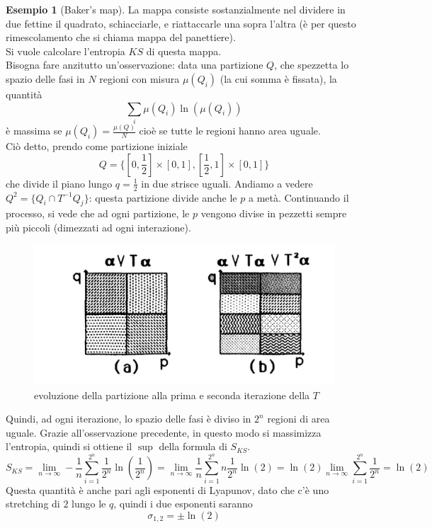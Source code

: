 \documentclass[a4paper,12pt]{article}
\theoremstyle{plain}
\theoremstyle{definition}
\newtheorem{exmp}{Esempio}[section]
\newcommand{\f}[2]{\frac{#1}{#2}}
\theoremstyle{remark}
\begin{document}
\begin{exmp}[Baker's map]
La mappa consiste sostanzialmente nel dividere in due fettine il quadrato, schiacciarle, e riattaccarle una sopra l'altra (è per questo rimescolamento che si chiama mappa del panettiere).\\
Si vuole calcolare l'entropia $KS$ di questa mappa.
\\Bisogna fare anzitutto un'osservazione: data una partizione $Q$, che spezzetta lo spazio delle fasi in $N$ regioni con misura $\mu(Q_i)$ (la cui somma è fissata), la quantità
\[\sum_i \mu(Q_i)\ln(\mu(Q_i))\]
è massima se $\mu(Q_i)=\f{\mu(Q)}{N}$ cioè se tutte le regioni hanno area uguale.
\\Ciò detto, prendo come partizione iniziale \[Q=\{[0,\f{1}{2}]\times[0,1],[\f{1}{2},1]\times[0,1]\}\]
che divide il piano lungo $q=\f{1}{2}$ in due strisce uguali. Andiamo a vedere $Q^2=\{Q_i\cap T^{-1} Q_j		\}$: questa partizione divide anche le $p$ a metà.
Continuando il processo, si vede che ad ogni partizione, le $p$ vengono divise in pezzetti sempre più piccoli (dimezzati ad ogni interazione).
\begin{figure}[h]
	\includegraphics[scale=0.3]{baker}
	\caption{evoluzione della partizione alla prima e seconda iterazione della $T$}
	\label{Baker}
\end{figure}
Quindi, ad ogni iterazione, lo spazio delle fasi è diviso in $2^n$ regioni di area uguale. Grazie all'osservazione precedente, in questo modo si massimizza l'entropia, quindi si ottiene il $\sup$ della formula di $S_{KS}$.
\[S_{KS}=\lim_{n\rightarrow\infty}	-\f{1}{n}\sum_{i=1}^{2^n} \f{1}{2^n} \ln(\f{1}{2^n})	=\lim_{n\rightarrow\infty}	\f{1}{n}\sum_{i=1}^{2^n} n\f{1}{2^n} \ln(2)	=\ln(2)\lim_{n\rightarrow\infty}	 \sum_{i=1}^{2^n}\f{1}{2^n}	=\ln(2)\]
Questa quantità è anche pari agli esponenti di Lyapunov, dato che c'è uno stretching di $2$ lungo le $q$, quindi i due esponenti saranno \[\sigma_{1,2}=\pm\ln(2)\]

\end{exmp}
\end{document}
